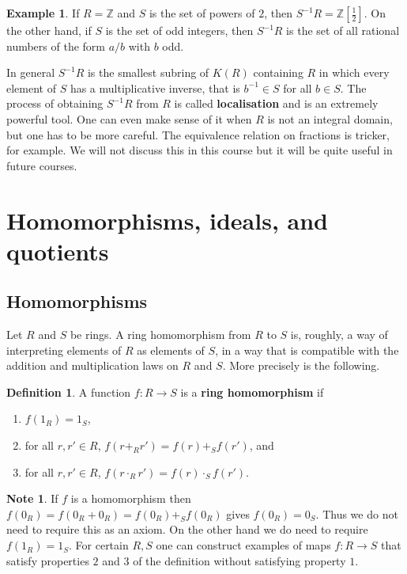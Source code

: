 \documentclass{article}
\newcommand{\Z}{\mathbb{Z}}
\newcommand{\rb}[1]{\left( #1 \right)}
\renewcommand{\sb}[1]{\left[ #1 \right]}
\theoremstyle{definition}\newtheorem{definition}{Definition}[section]
\theoremstyle{definition}\newtheorem{remark}[definition]{Remark}
\theoremstyle{definition}\newtheorem*{example}{Example}
\theoremstyle{definition}\newtheorem*{note}{Note}
\begin{document}
\begin{example}
If $ R = \Z $ and $ S $ is the set of powers of $ 2 $, then $ S^{-1}R = \Z\sb{\tfrac{1}{2}} $. On the other hand, if $ S $ is the set of odd integers, then $ S^{-1}R $ is the set of all rational numbers of the form $ a / b $ with $ b $ odd.
\end{example}

In general $ S^{-1}R $ is the smallest subring of $ K\rb{R} $ containing $ R $ in which every element of $ S $ has a multiplicative inverse, that is $ b^{-1} \in S $ for all $ b \in S $. The process of obtaining $ S^{-1}R $ from $ R $ is called \textbf{localisation} and is an extremely powerful tool. One can even make sense of it when $ R $ is not an integral domain, but one has to be more careful. The equivalence relation on fractions is tricker, for example. We will not discuss this in this course but it will be quite useful in future courses.

\section{Homomorphisms, ideals, and quotients}

\subsection{Homomorphisms}

Let $ R $ and $ S $ be rings. A ring homomorphism from $ R $ to $ S $ is, roughly, a way of interpreting elements of $ R $ as elements of $ S $, in a way that is compatible with the addition and multiplication laws on $ R $ and $ S $. More precisely is the following.

\begin{definition}
A function $ f : R \to S $ is a \textbf{ring homomorphism} if
\begin{enumerate}
\item $ f\rb{1_R} = 1_S $,
\item for all $ r, r' \in R $, $ f\rb{r +_R r'} = f\rb{r} +_S f\rb{r'} $, and
\item for all $ r, r' \in R $, $ f\rb{r \cdot_R r'} = f\rb{r} \cdot_S f\rb{r'} $.
\end{enumerate}
\end{definition}

\begin{note}
If $ f $ is a homomorphism then $ f\rb{0_R} = f\rb{0_R + 0_R} = f\rb{0_R} +_S f\rb{0_R} $ gives $ f\rb{0_R} = 0_S $. Thus we do not need to require this as an axiom. On the other hand we do need to require $ f\rb{1_R} = 1_S $. For certain $ R, S $ one can construct examples of maps $ f : R \to S $ that satisfy properties $ 2 $ and $ 3 $ of the definition without satisfying property $ 1 $.
\end{note}
\end{document}
